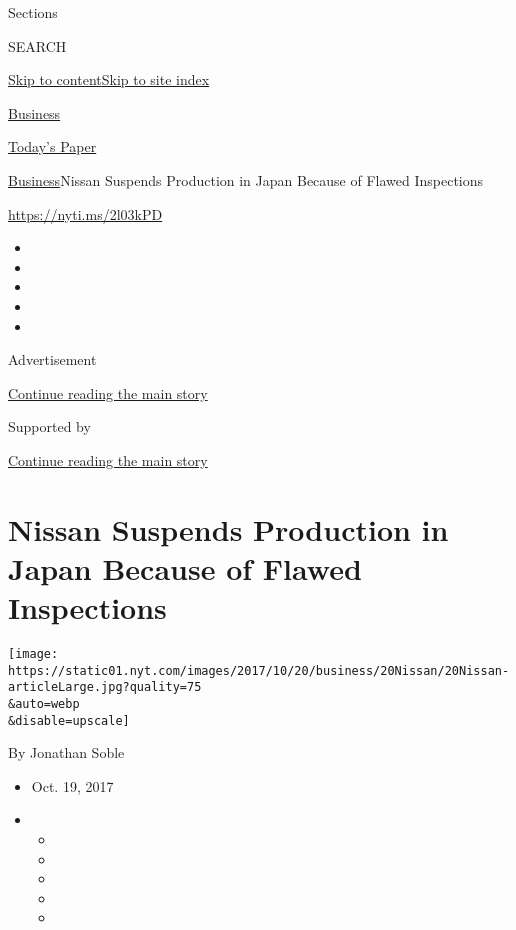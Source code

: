 Sections

SEARCH

\protect\hyperlink{site-content}{Skip to
content}\protect\hyperlink{site-index}{Skip to site index}

\href{https://www.nytimes.com/section/business}{Business}

\href{https://myaccount.nytimes.com/auth/login?response_type=cookie\&client_id=vi}{}

\href{https://www.nytimes.com/section/todayspaper}{Today's Paper}

\href{/section/business}{Business}\textbar{}Nissan Suspends Production
in Japan Because of Flawed Inspections

\url{https://nyti.ms/2l03kPD}

\begin{itemize}
\item
\item
\item
\item
\item
\end{itemize}

Advertisement

\protect\hyperlink{after-top}{Continue reading the main story}

Supported by

\protect\hyperlink{after-sponsor}{Continue reading the main story}

\hypertarget{nissan-suspends-production-in-japan-because-of-flawed-inspections}{%
\section{Nissan Suspends Production in Japan Because of Flawed
Inspections}\label{nissan-suspends-production-in-japan-because-of-flawed-inspections}}

\texttt{[image: https://static01.nyt.com/images/2017/10/20/business/20Nissan/20Nissan-articleLarge.jpg?quality=75\\\&auto=webp\\\&disable=upscale]}

By Jonathan Soble

\begin{itemize}
\item
  Oct. 19, 2017
\item
  \begin{itemize}
  \item
  \item
  \item
  \item
  \item
  \end{itemize}
\end{itemize}

